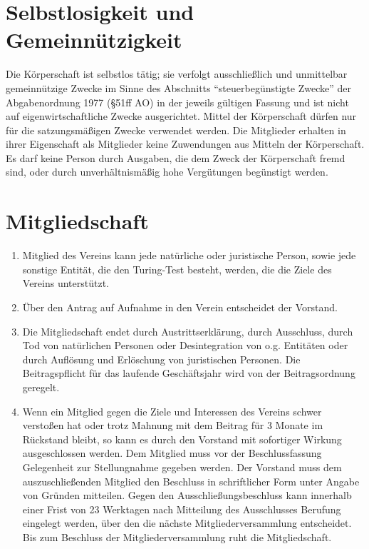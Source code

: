 \documentclass[a4paper,11pt]{scrartcl}
\begin{document}
\section{Selbstlosigkeit und Gemeinnützigkeit}
Die Körperschaft ist selbstlos tätig; sie verfolgt ausschließlich und 
unmittelbar gemeinnützige Zwecke im Sinne des Abschnitts "`steuerbegünstigte 
Zwecke"' der Abgabenordnung 1977 (§51ff AO) in der jeweils gültigen Fassung 
und ist nicht auf eigenwirtschaftliche Zwecke ausgerichtet. Mittel der 
Körperschaft dürfen nur für die satzungsmäßigen Zwecke verwendet werden. 
Die Mitglieder erhalten in ihrer Eigenschaft als Mitglieder keine Zuwendungen 
aus Mitteln der Körperschaft. Es darf keine Person durch Ausgaben, die dem 
Zweck der Körperschaft fremd sind, oder durch unverhältnismäßig hohe 
Vergütungen begünstigt werden.

\section{Mitgliedschaft}
\begin{enumerate}
  \item Mitglied des Vereins kann jede natürliche oder juristische Person, sowie 
    jede sonstige Entität, die den Turing-Test besteht, werden, die die Ziele des 
    Vereins unterstützt.
  \item Über den Antrag auf Aufnahme in den Verein entscheidet der Vorstand.
  \item Die Mitgliedschaft endet durch Austrittserklärung, durch Ausschluss, 
    durch Tod von natürlichen Personen oder Desintegration von o.g. Entitäten 
    oder durch Auflösung und Erlöschung von juristischen Personen. Die 
    Beitragspflicht für das laufende Geschäftsjahr wird von der Beitragsordnung 
    geregelt.
  \item Wenn ein Mitglied gegen die Ziele und Interessen des Vereins schwer 
    verstoßen hat oder trotz Mahnung mit dem Beitrag für 3 Monate im Rückstand 
    bleibt, so kann es durch den Vorstand mit sofortiger Wirkung ausgeschlossen 
    werden. Dem Mitglied muss vor der Beschlussfassung Gelegenheit zur 
    Stellungnahme gegeben werden. Der Vorstand muss dem auszuschließenden Mitglied 
    den Beschluss in schriftlicher Form unter Angabe von Gründen mitteilen. Gegen 
    den Ausschließungsbeschluss kann innerhalb einer Frist von 23 Werktagen nach 
    Mitteilung des Ausschlusses Berufung eingelegt werden, über den die nächste 
    Mitgliederversammlung entscheidet. Bis zum Beschluss der Mitgliederversammlung 
    ruht die Mitgliedschaft.
\end{enumerate}
\end{document}

